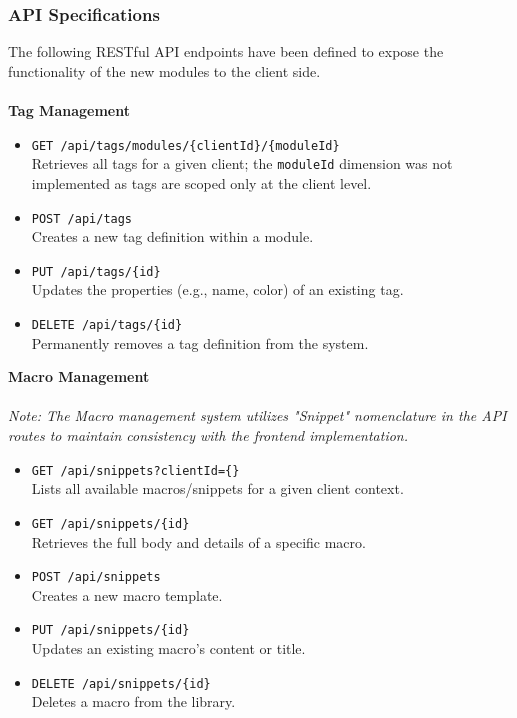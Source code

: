 \subsubsection{API Specifications}
The following RESTful API endpoints have been defined to expose the functionality of the new modules to the client side.
\\\\
\textbf{Tag Management}

\begin{itemize}
    \item \texttt{GET /api/tags/modules/\{clientId\}/\{moduleId\}} \\ Retrieves all tags for a given client; the \texttt{moduleId} dimension was not implemented as tags are scoped only at the client level.
    \item \texttt{POST /api/tags} \\ Creates a new tag definition within a module.
    \item \texttt{PUT /api/tags/\{id\}} \\ Updates the properties (e.g., name, color) of an existing tag.
    \item \texttt{DELETE /api/tags/\{id\}} \\ Permanently removes a tag definition from the system.
\end{itemize}

\textbf{Macro Management}
\\\\
\textit{Note: The Macro management system utilizes "Snippet" nomenclature in the API routes to maintain consistency with the frontend implementation.}

\begin{itemize}
    \item \texttt{GET /api/snippets?clientId=\{\}} \\ Lists all available macros/snippets for a given client context.
    \item \texttt{GET /api/snippets/\{id\}} \\ Retrieves the full body and details of a specific macro.
    \item \texttt{POST /api/snippets} \\ Creates a new macro template.
    \item \texttt{PUT /api/snippets/\{id\}} \\ Updates an existing macro's content or title.
    \item \texttt{DELETE /api/snippets/\{id\}} \\ Deletes a macro from the library.
\end{itemize}

